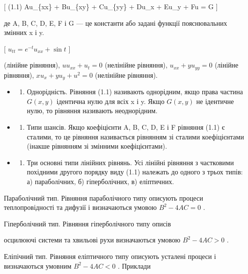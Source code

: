 \documentclass[
]{article}
\providecommand{\tightlist}{%
  \setlength{\itemsep}{0pt}\setlength{\parskip}{0pt}}
\begin{document}
{[} (1.1) Au\_\{xx\} + Bu\_\{xy\} + Cu\_\{yy\} + Du\_x + Eu\_y + Fu = G
{]}

де A, B, C, D, E, F і G --- це константи або задані функції
пояснювальних змінних x і y.

{[} \(u_{tt} = e^{-t}u_{xx} + \sin t\) {]}

(лінійне рівняння), \(uu_{xx} + u_t = 0\) (нелінійне рівняння),
\(u_{xx} + yu_{yy} = 0\) (лінійне рівняння), \(xu_x + yu_y + u^2 = 0\)
(нелінійне рівняння).

\begin{itemize}
\tightlist
\item
  \begin{enumerate}
  \def\labelenumi{\arabic{enumi}.}
  \setcounter{enumi}{3}
  \tightlist
  \item
    Однорідність. Рівняння (1.1) називають однорідним, якщо права
    частина \(G(x, y)\) ідентична нулю для всіх x і y. Якщо \(G(x, y)\)
    не ідентичне нулю, то рівняння називають неоднорідним.
  \end{enumerate}
\item
  \begin{enumerate}
  \def\labelenumi{\arabic{enumi}.}
  \setcounter{enumi}{4}
  \tightlist
  \item
    Типи шансів. Якщо коефіцієнти A, B, C, D, E і F рівняння (1.1) є
    сталими, то це рівняння називається рівнянням зі сталими
    коефіцієнтами (інакше рівнянням зі змінними коефіцієнтами).
  \end{enumerate}
\item
  \begin{enumerate}
  \def\labelenumi{\arabic{enumi}.}
  \setcounter{enumi}{5}
  \tightlist
  \item
    Три основні типи лінійних рівнянь. Усі лінійні рівняння з частковими
    похідними другого порядку виду (1.1) належать до одного з трьох
    типів: а) параболічних, б) гіперболічних, в) еліптичних.
  \end{enumerate}
\end{itemize}

Параболічний тип. Рівняння параболічного типу описують процеси
теплопровідності та дифузії і визначаються умовою \(B^2 - 4AC = 0\) .

Гіперболічний тип. Рівняння гіперболічного типу описів

осцилюючі системи та хвильові рухи визначаються умовою \(B^2-4AC>0\) .

Еліпічний тип. Рівняння еліптичного типу описують усталені процеси і
визначаються умовним \(B^2-4AC<0\) . Приклади
\end{document}
